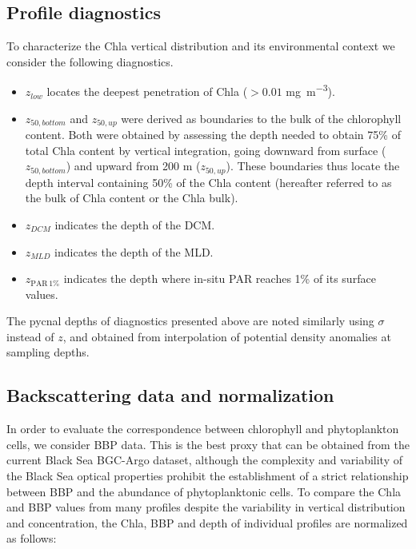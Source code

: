 \documentclass[journal abbreviation, manuscript]{copernicus}
\begin{document}
\subsection{Profile diagnostics}
\label{sec:diagdef}
To characterize the Chla vertical distribution and its environmental context we consider the following diagnostics.

\begin{itemize}
    \item $z_{low}$ locates the deepest penetration of Chla ($>0.01$ \unit{mg~m^{-3}}).
    \item $z_{50,bottom}$ and $z_{50,up}$ were derived as boundaries to the bulk of the chlorophyll content. 
Both were obtained by assessing the depth needed to obtain 75\% of total Chla content by vertical integration, going downward from surface ($z_{50,bottom}$) and upward from 200 \unit{m} ($z_{50,up}$).
These boundaries thus locate the depth interval containing 50\% of the Chla content (hereafter referred to as the bulk of Chla content or the Chla bulk). 
    \item $z_{DCM}$ indicates the depth of the DCM.
    \item $z_{MLD}$ indicates the depth of the MLD.
    \item $z_{\mathrm{PAR}\,1\%}$ indicates the depth where in-situ PAR reaches 1\% of its surface values.
\end{itemize}

The pycnal depths of diagnostics presented above are noted similarly using $\sigma$ instead of $z$, and obtained from interpolation of potential density anomalies at sampling depths.

\subsection{Backscattering data and normalization}
 \label{sec:norm}
 
 In order to evaluate the correspondence between chlorophyll and phytoplankton cells, we consider BBP data.
 This is the best proxy that can be obtained from the current Black Sea BGC-Argo dataset, although the complexity and variability of the Black Sea optical properties \citep{Churilova2017} prohibit the establishment of a strict relationship between BBP and the abundance of phytoplanktonic cells.
 To compare the Chla and BBP values from many profiles despite the variability in vertical distribution and concentration, the Chla, BBP and depth of individual profiles are normalized as follows:
 
\end{document}
